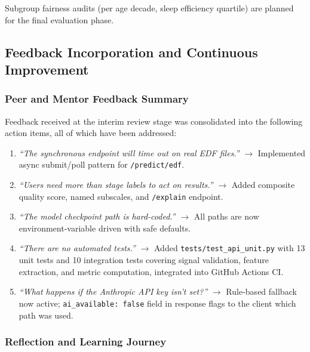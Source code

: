 \documentclass[10pt]{article}
\begin{document}
Subgroup fairness audits (per age decade, sleep efficiency quartile) are planned for the final evaluation phase.

\subsection{Feedback Incorporation and Continuous Improvement}
\label{sec:feedbackInterim}

\subsubsection{Peer and Mentor Feedback Summary}
\label{sec:peerMentorFeedback}

Feedback received at the interim review stage was consolidated into the following action items, all of which have been addressed:

\begin{enumerate}
  \item \textit{``The synchronous endpoint will time out on real EDF files.''} $\rightarrow$ Implemented async submit/poll pattern for \texttt{/predict/edf}.
  \item \textit{``Users need more than stage labels to act on results.''} $\rightarrow$ Added composite quality score, named subscales, and \texttt{/explain} endpoint.
  \item \textit{``The model checkpoint path is hard-coded.''} $\rightarrow$ All paths are now environment-variable driven with safe defaults.
  \item \textit{``There are no automated tests.''} $\rightarrow$ Added \texttt{tests/test\_api\_unit.py} with 13 unit tests and 10 integration tests covering signal validation, feature extraction, and metric computation, integrated into GitHub Actions CI.
  \item \textit{``What happens if the Anthropic API key isn't set?''} $\rightarrow$ Rule-based fallback now active; \texttt{ai\_available: false} field in response flags to the client which path was used.
\end{enumerate}

\subsubsection{Reflection and Learning Journey}
\label{sec:reflectionLearning}
\end{document}
